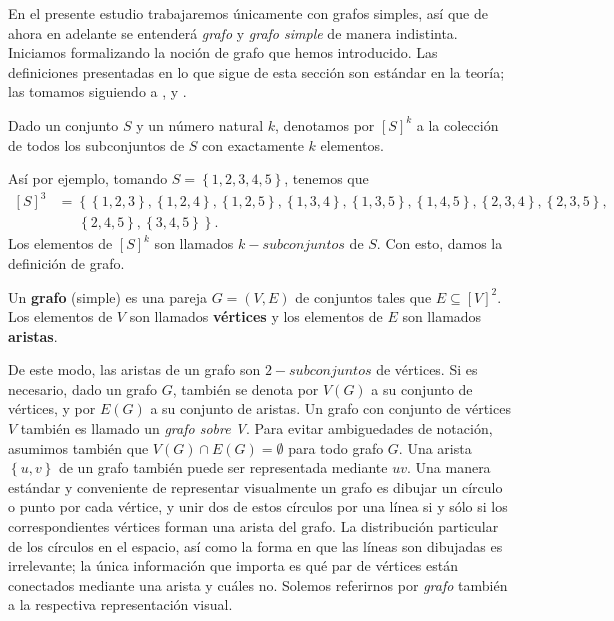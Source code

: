 En el presente estudio trabajaremos únicamente con grafos simples, así que de ahora en adelante se entenderá \textit{grafo} y \textit{grafo simple} de manera indistinta. Iniciamos formalizando la noción de grafo que hemos introducido. Las definiciones presentadas en lo que sigue de esta sección son estándar en la teoría; las tomamos siguiendo a \cite{diestel2017}, \cite{gomez2025} y \cite{jafarian2013}.
\begin{Not}
Dado un conjunto $S$ y un número natural $k$, denotamos por $[S]^k$ a la colección de todos los subconjuntos de $S$ con exactamente $k$ elementos.
\end{Not}\clearpage
Así por ejemplo, tomando $S=\left\lbrace 1,2,3,4,5 \right\rbrace$, tenemos que 
$$
\begin{aligned}
   [S]^3 &= \left\lbrace \left\lbrace 1,2,3\right\rbrace, \left\lbrace 1,2,4\right\rbrace, \left\lbrace 1,2,5\right\rbrace, \left\lbrace 1,3,4\right\rbrace, \left\lbrace 1,3,5\right\rbrace, \left\lbrace 1,4,5\right\rbrace, \left\lbrace 2,3,4\right\rbrace, \left\lbrace 2,3,5\right\rbrace \right.,\\
         &\phantom{ooo} \left. \left\lbrace 2,4,5\right\rbrace, \left\lbrace 3,4,5\right\rbrace\right\rbrace. 
\end{aligned}
$$
Los elementos de $[S]^k$ son llamados $k-subconjuntos$ de $S$. Con esto, damos la definición de grafo.
\begin{Def}
   Un \textbf{grafo} (simple) es una pareja $G=\left( V,E\right)$ de conjuntos tales que $E\subseteq [V]^2$. Los elementos de $V$ son llamados \textbf{vértices} y los elementos de $E$ son llamados \textbf{aristas}.
\end{Def}
De este modo, las aristas de un grafo son $2-subconjuntos$ de vértices. Si es necesario, dado un grafo $G$, también se denota por $V(G)$ a su conjunto de vértices, y por $E(G)$ a su conjunto de aristas. Un grafo con conjunto de vértices $V$ también es llamado un \textit{grafo sobre V}. Para evitar ambiguedades de notación, asumimos también que $V(G)\cap E(G)=\emptyset$ para todo grafo $G$. Una arista $\left\lbrace u,v\right\rbrace$ de un grafo también puede ser representada mediante $uv$. Una manera estándar y conveniente de representar visualmente un grafo es dibujar un círculo o punto por cada vértice, y unir dos de estos círculos por una línea si y sólo si los correspondientes vértices forman una arista del grafo. La distribución particular de los círculos en el espacio, así como la forma en que las líneas son dibujadas es irrelevante; la única información que importa es qué par de vértices están conectados mediante una arista y cuáles no. Solemos referirnos por \textit{grafo} también a la respectiva representación visual.

